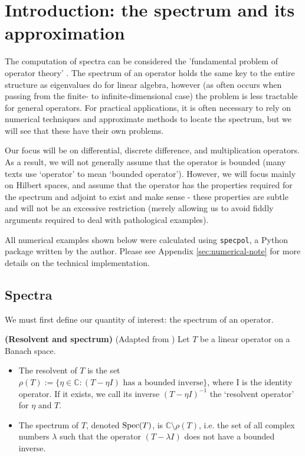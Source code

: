 \documentclass[../main.tex]{subfiles}
\begin{document}
\section{Introduction: the spectrum and its approximation}

The computation of spectra can be considered the 'fundamental problem of
operator theory' \parencite{arveson2002short}. The spectrum of an operator holds
the same key to the entire structure as eigenvalues do for linear algebra,
however (as often occurs when passing from the finite- to infinite-dimensional
case) the problem is less tractable for general operators. For practical
applications, it is often necessary to rely on numerical techniques and
approximate methods to locate the spectrum, but we will see that these have
their own problems.

Our focus will be on differential, discrete difference, and multiplication
operators. As a result, we will not generally assume that the operator is
bounded (many texts use `operator' to mean `bounded operator'). However, we will
focus mainly on Hilbert spaces, and assume that the operator has the properties
required for the spectrum and adjoint to exist and make sense - these properties
are subtle and will not be an excessive restriction (merely allowing us to avoid
fiddly arguments required to deal with pathological examples).

All numerical examples shown below were calculated using \texttt{specpol}, a
Python package written by the author. Please see Appendix
\ref{sec:numerical-note} for more details on the technical implementation.
\subsection{Spectra}

We must first define our quantity of interest: the spectrum of an operator.
\begin{definition}{\textbf{(Resolvent and spectrum)}}
(Adapted from \parencite{edmunds2018spectral}) Let $T$ be a linear operator on a Banach space.
\begin{itemize}
\item The resolvent of $T$ is the set 
      $\rho(T) := \{\eta \in \mathbb{C} : (T - \eta I)\text{ has a bounded inverse}\}$,
      where I is the identity
      operator. If it exists, we call its inverse $(T - \eta I)^{-1}$
      the `resolvent operator' for $\eta$ and $T$.
\item The spectrum of $T$, denoted $\mathrm{Spec}(T)$, 
      is $\mathbb{C} \setminus \rho(T)$, i.e. the set of all complex numbers $\lambda$
      such that the operator $(T - \lambda I)$ does not have a bounded inverse.
\end{itemize}
\end{definition}
\end{document}
